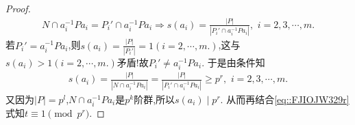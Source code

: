 \documentclass[../../main.tex]{subfiles}%
\begin{document}
\begin{proof}
\begin{align*}
N\cap a_i^{-1}Pa_i=P_i'\cap a_i^{-1}Pa_i\Longrightarrow s(a_i)=\frac{\left| P \right|}{\left| P_i'\cap a_i^{-1}Pa_i \right|},\,\,i=2,3,\cdots,m.
\end{align*}
若$P_i'=a_i^{-1}Pa_i$,则$s(a_i)=\frac{|P|}{|P_i'|}=1(i=2,\cdots,m.)$,这与$s(a_i)>1(i=2,\cdots,m.)$矛盾!故$P_i'\neq a_i^{-1}Pa_i$.
于是由条件知
\begin{align*}
s(a_i)=\frac{|P|}{|N\cap a_i^{-1}Pa_i|}=\frac{\left| P \right|}{\left| P_i'\cap a_i^{-1}Pa_i \right|}\geqslant p^r,\,\,i=2,3,\cdots,m.
\end{align*}
又因为$|P|=p^l$,$N\cap a_i^{-1}Pa_i$是$p^k$阶群,所以$s(a_i)\mid p^r$.
从而再结合\eqref{eq::FJIOJW329r}式知$t\equiv 1\pmod{p^r}$.

\end{proof}
\end{document}
